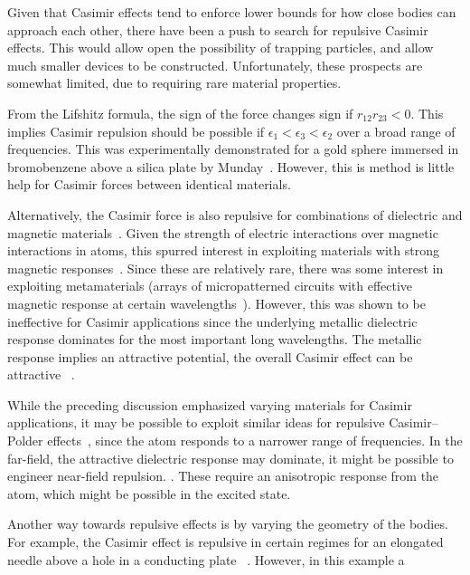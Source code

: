 Given that Casimir effects tend to enforce lower bounds for how close bodies can approach each other,
there have been a push to search for repulsive Casimir effects.  This would allow open the possibility
of trapping particles, and allow much smaller devices to be constructed.  
Unfortunately, these prospects are somewhat limited, due to requiring rare material properties.

From the Lifshitz formula, the sign of the force changes sign if $r_{12}r_{23}<0$.
This implies Casimir repulsion should be possible if $\epsilon_1<\epsilon_3<\epsilon_2$ over a broad range of frequencies.
This was experimentally demonstrated for a gold sphere immersed in bromobenzene above a silica plate
by Munday~\etal\cite{Munday2009}.  However, this is method is little help for Casimir forces between
identical materials.  

Alternatively, the Casimir force is also repulsive for combinations of dielectric and magnetic materials~\cite{Boyer1974}.  
Given the strength of electric interactions over magnetic interactions in atoms, this spurred interest
in exploiting materials with strong magnetic responses~\cite{Kenneth2002}.  
Since these are relatively rare, there was some interest in exploiting metamaterials (arrays of micropatterned circuits with
effective magnetic response at certain wavelengths~\cite{Pendry1999}).  However, this was shown to be ineffective
for Casimir applications since the underlying metallic dielectric response dominates for the most important long wavelengths.
The metallic response implies an attractive potential, the overall Casimir effect can be attractive~
\cite{Ianuzzi2003comment,Rosa2008,Pirozhenko2008,Yannopapas2009}.  

While the preceding discussion emphasized varying materials for Casimir applications, it may 
be possible to exploit similar ideas for repulsive Casimir--Polder effects~\cite{Milton2011,Milton2012},
since the atom responds to a narrower range of frequencies.  In the far-field, the attractive dielectric
response may dominate, it might be possible to engineer near-field repulsion.  .
These require an anisotropic response from the atom, which might be possible in the excited state.

Another way towards repulsive effects is by varying the geometry of the bodies.  
For example, the Casimir effect is repulsive in certain regimes for an elongated needle above a hole in a conducting plate~
\cite{Levin2010}.  However, in this example a 



